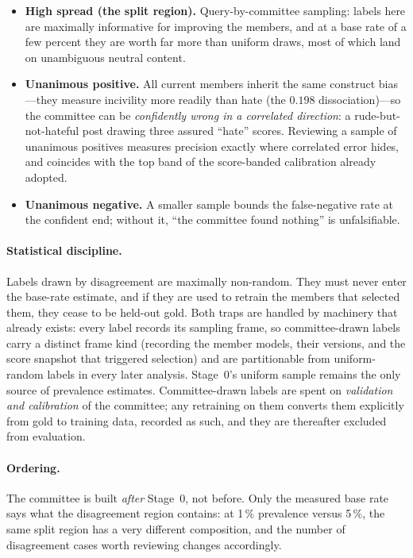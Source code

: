 \documentclass[11pt,a4paper]{article}
\begin{document}
\begin{itemize}
\item \textbf{High spread (the split region).} Query-by-committee sampling: labels
      here are maximally informative for improving the members, and at a base rate
      of a few percent they are worth far more than uniform draws, most of which
      land on unambiguous neutral content.
\item \textbf{Unanimous positive.} All current members inherit the same construct
      bias---they measure incivility more readily than hate (the $0.198$
      dissociation)---so the committee can be \emph{confidently wrong in a
      correlated direction}: a rude-but-not-hateful post drawing three assured
      ``hate'' scores. Reviewing a sample of unanimous positives measures precision
      exactly where correlated error hides, and coincides with the top band of the
      score-banded calibration already adopted.
\item \textbf{Unanimous negative.} A smaller sample bounds the false-negative rate
      at the confident end; without it, ``the committee found nothing'' is
      unfalsifiable.
\end{itemize}

\paragraph{Statistical discipline.} Labels drawn by disagreement are maximally
non-random. They must never enter the base-rate estimate, and if they are used to
retrain the members that selected them, they cease to be held-out gold. Both traps
are handled by machinery that already exists: every label records its sampling
frame, so committee-drawn labels carry a distinct frame kind (recording the member
models, their versions, and the score snapshot that triggered selection) and are
partitionable from uniform-random labels in every later analysis. Stage~0's uniform
sample remains the only source of prevalence estimates. Committee-drawn labels are
spent on \emph{validation and calibration} of the committee; any retraining on them
converts them explicitly from gold to training data, recorded as such, and they are
thereafter excluded from evaluation.

\paragraph{Ordering.} The committee is built \emph{after} Stage~0, not before. Only
the measured base rate says what the disagreement region contains: at 1\,\%
prevalence versus 5\,\%, the same split region has a very different composition,
and the number of disagreement cases worth reviewing changes accordingly.
\end{document}
